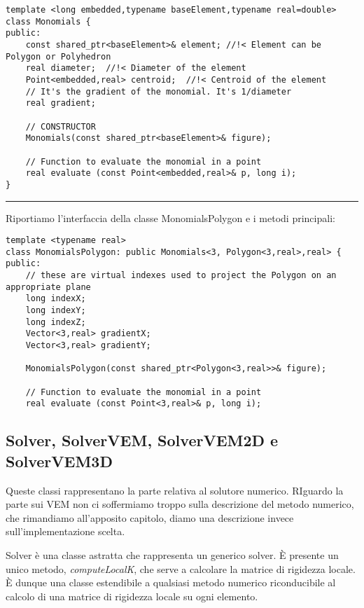 \documentclass[oneside,12pt]{book}  %
\theoremstyle{plain}
\theoremstyle{definition}
\theoremstyle{remark}
\numberwithin{equation}{chapter} %
\begin{document}
\begin{verbatim}
template <long embedded,typename baseElement,typename real=double>
class Monomials {
public:
    const shared_ptr<baseElement>& element;	//!< Element can be Polygon or Polyhedron
    real diameter;  //!< Diameter of the element
    Point<embedded,real> centroid;  //!< Centroid of the element
    // It's the gradient of the monomial. It's 1/diameter
    real gradient;

    // CONSTRUCTOR
    Monomials(const shared_ptr<baseElement>& figure);

    // Function to evaluate the monomial in a point
    real evaluate (const Point<embedded,real>& p, long i);
}

\end{verbatim}



\noindent\rule{14cm}{1pt}

Riportiamo l'interfaccia della classe MonomialsPolygon e i metodi principali:

\begin{verbatim}
template <typename real>
class MonomialsPolygon: public Monomials<3, Polygon<3,real>,real> {
public:
    // these are virtual indexes used to project the Polygon on an appropriate plane
    long indexX;
    long indexY;
    long indexZ;
    Vector<3,real> gradientX;
    Vector<3,real> gradientY;
	
    MonomialsPolygon(const shared_ptr<Polygon<3,real>>& figure); 

    // Function to evaluate the monomial in a point
    real evaluate (const Point<3,real>& p, long i);

\end{verbatim}

\subsection{Solver, SolverVEM, SolverVEM2D e SolverVEM3D}
Queste classi rappresentano la parte relativa al solutore numerico. 
RIguardo la parte sui VEM non ci soffermiamo troppo sulla descrizione
del metodo numerico, che rimandiamo all'apposito capitolo, diamo una
descrizione invece sull'implementazione scelta.

Solver \`e una classe astratta che rappresenta un generico
solver. \`E presente un unico metodo, \textit{computeLocalK}, che
serve a calcolare la matrice di rigidezza locale. \`E dunque una
classe estendibile a qualsiasi metodo numerico riconducibile al
calcolo di una matrice di rigidezza locale su ogni elemento.
\end{document}
